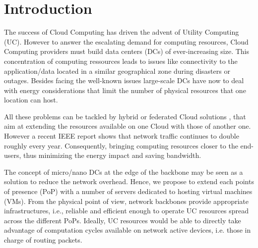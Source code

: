 \section{Introduction}
\label{sec:intro} 



The success of Cloud Computing has driven the advent of Utility Computing (UC). 
However to answer the escalating demand for computing resources, 
Cloud Computing providers must build data centers (DCs) of ever-increasing size.
This concentration of computing ressources leads to issues like connectivity to
the application/data located in a similar geographical zone during disasters or
outages. Besides facing the well-known issues large-scale DCs have now to deal 
with energy considerations that limit the number of physical resources that one 
location can host.

All these problems can be tackled by hybrid or federated Cloud solutions 
\cite{armbrust:2010}, that aim at extending the resources available on one Cloud
with those of another one. However a recent IEEE report 
\cite{ieeenetreport:2012} shows that network traffic continues to double 
roughly every year. Consequently, bringing computing resources closer to the 
end-users, thus minimizing the energy impact and saving bandwidth.

The concept of micro/nano DCs at the edge of the backbone \cite{greenberg:2008} 
may be seen as a solution to reduce the network overhead. Hence, we propose to 
extend each points of presence (PoP) with a number of servers dedicated to 
hosting virtual machines (VMs). From the physical point of view, network 
backbones provide appropriate infrastructures, i.e., reliable and efficient 
enough to operate UC resources spread across the different PoPs. Ideally, UC 
resources would be able to directly take advantage of computation cycles 
available on network active devices, i.e. those in charge of routing packets.

